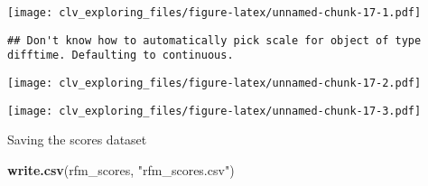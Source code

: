 \documentclass[]{article}
\newenvironment{Shaded}{\begin{snugshade}}{\end{snugshade}}
\newcommand{\DataTypeTok}[1]{\textcolor[rgb]{0.13,0.29,0.53}{#1}}
\newcommand{\KeywordTok}[1]{\textcolor[rgb]{0.13,0.29,0.53}{\textbf{#1}}}
\newcommand{\NormalTok}[1]{#1}
\newcommand{\OperatorTok}[1]{\textcolor[rgb]{0.81,0.36,0.00}{\textbf{#1}}}
\newcommand{\StringTok}[1]{\textcolor[rgb]{0.31,0.60,0.02}{#1}}
\begin{document}
\texttt{[image: clv\_exploring\_files/figure-latex/unnamed-chunk-17-1.pdf]}

\begin{Shaded}
\end{Shaded}

\begin{verbatim}
## Don't know how to automatically pick scale for object of type difftime. Defaulting to continuous.
\end{verbatim}

\texttt{[image: clv\_exploring\_files/figure-latex/unnamed-chunk-17-2.pdf]}

\begin{Shaded}
\end{Shaded}

\texttt{[image: clv\_exploring\_files/figure-latex/unnamed-chunk-17-3.pdf]}

Saving the scores dataset

\begin{Shaded}
\begin{Highlighting}[]
\KeywordTok{write.csv}\NormalTok{(rfm_scores, }\StringTok{"rfm_scores.csv"}\NormalTok{)}
\end{Highlighting}
\end{Shaded}
\end{document}
